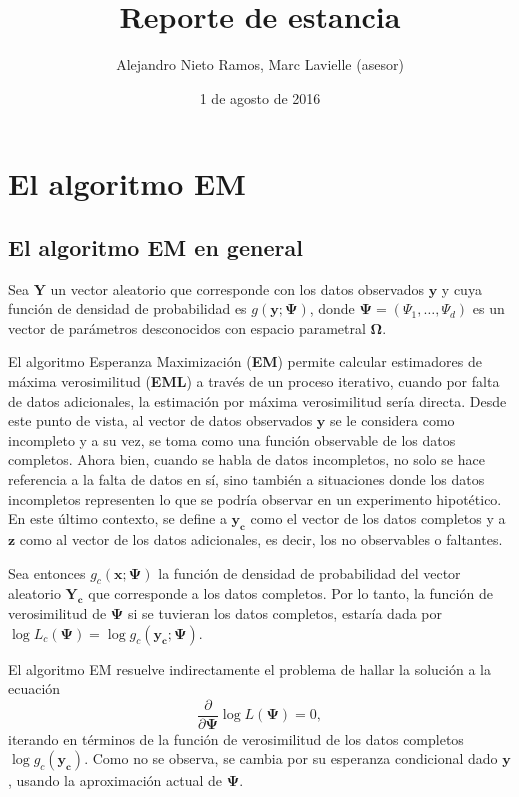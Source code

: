 \documentclass[
]{article}
\title{Reporte de estancia}
\author{Alejandro Nieto Ramos, Marc Lavielle (asesor)}
\date{1 de agosto de 2016}
\begin{document}
\maketitle

\section{El algoritmo EM}\label{EM}

\subsection{El algoritmo EM en general}

Sea \(\bm{Y}\) un vector aleatorio que corresponde con los datos
observados \(\bm{y}\) y cuya función de densidad de probabilidad es
\(g(\bm{y};\bm{\Psi})\), donde \(\bm{\Psi}=(\Psi_1,\ldots,\Psi_d)\) es
un vector de parámetros desconocidos con espacio parametral
\(\bm{\Omega}\).

El algoritmo Esperanza Maximización (\textbf{EM}) permite calcular
estimadores de máxima verosimilitud (\textbf{EML}) a través de un
proceso iterativo, cuando por falta de datos adicionales, la estimación
por máxima verosimilitud sería directa. Desde este punto de vista, al
vector de datos observados \(\bm{y}\) se le considera como incompleto y
a su vez, se toma como una función observable de los datos completos.
Ahora bien, cuando se habla de datos incompletos, no solo se hace
referencia a la falta de datos en sí, sino también a situaciones donde
los datos incompletos representen lo que se podría observar en un
experimento hipotético. En este último contexto, se define a
\(\bm{y_c}\) como el vector de los datos completos y a \(\bm{z}\) como
al vector de los datos adicionales, es decir, los no observables o
faltantes.

Sea entonces \(g_c(\bm{x};\bm{\Psi})\) la función de densidad de
probabilidad del vector aleatorio \(\bm{Y_c}\) que corresponde a los
datos completos. Por lo tanto, la función de verosimilitud de
\(\bm{\Psi}\) si se tuvieran los datos completos, estaría dada por
\(\log L_c(\bm{\Psi})= \log g_c(\bm{y_c};\bm{\Psi})\).

El algoritmo EM resuelve indirectamente el problema de hallar la
solución a la ecuación \begin{equation}
\frac{\partial}{\partial \bm{\Psi}} \log L(\bm{\Psi})=0, \label{MV}
\end{equation} iterando en términos de la función de verosimilitud de
los datos completos \(\log g_c(\bm{y_c})\). Como no se observa, se
cambia por su esperanza condicional dado \(\bm{y}\), usando la
aproximación actual de \(\bm{\Psi}\).
\end{document}
